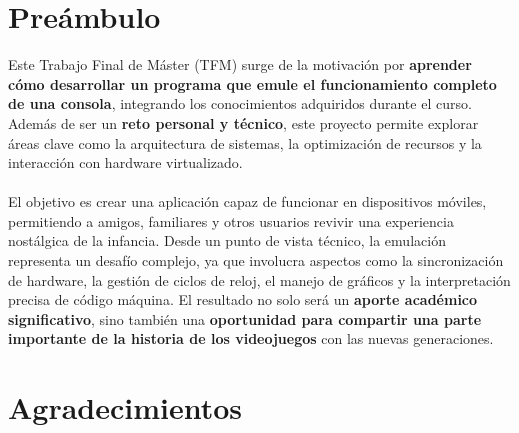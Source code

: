 \chapter*{Preámbulo}
\thispagestyle{empty}

Este Trabajo Final de Máster (TFM) surge de la motivación por \textbf{aprender cómo desarrollar un programa que emule el funcionamiento completo de una consola}, integrando los conocimientos adquiridos durante el curso. Además de ser un \textbf{reto personal y técnico}, este proyecto permite explorar áreas clave como la arquitectura de sistemas, la optimización de recursos y la interacción con hardware virtualizado.
\\\\
El objetivo es crear una aplicación capaz de funcionar en dispositivos móviles, permitiendo a amigos, familiares y otros usuarios revivir una experiencia nostálgica de la infancia. Desde un punto de vista técnico, la emulación representa un desafío complejo, ya que involucra aspectos como la sincronización de hardware, la gestión de ciclos de reloj, el manejo de gráficos y la interpretación precisa de código máquina. El resultado no solo será un \textbf{aporte académico significativo}, sino también una \textbf{oportunidad para compartir una parte importante de la historia de los videojuegos} con las nuevas generaciones.

\cleardoublepage %
\chapter*{Agradecimientos}

\thispagestyle{empty}
\vspace{1cm}


